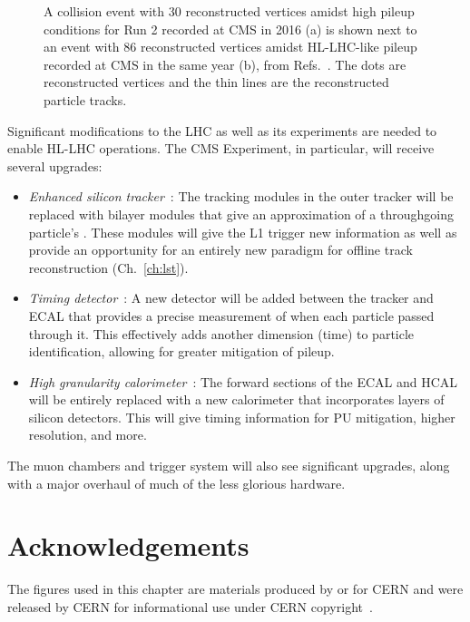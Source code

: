 \begin{figure}[!htb]
    \centering
    \qquad
    \caption[A collision event with high pileup for Run 2 versus another with HL-LHC-like pileup, both recorded in 2016.]{
        A collision event with 30 reconstructed vertices amidst high pileup conditions for Run 2 recorded at CMS in 2016 (a) is shown next to an event with 86 reconstructed vertices amidst HL-LHC-like pileup recorded at CMS in the same year (b), from Refs.~\cite{NormalPU2016, HighPU2016}. 
        The dots are reconstructed vertices and the thin lines are the reconstructed particle tracks.
    }
    \label{fig:pileup}
\end{figure}

Significant modifications to the LHC as well as its experiments are needed to enable HL-LHC operations. 
The CMS Experiment, in particular, will receive several upgrades: 
\begin{itemize}
    \item{
        \textit{Enhanced silicon tracker}~\cite{CERN-LHCC-2017-009}: 
        The tracking modules in the outer tracker will be replaced with bilayer modules that give an approximation of a throughgoing particle's \pt. 
        These modules will give the L1 trigger new information as well as provide an opportunity for an entirely new paradigm for offline track reconstruction (Ch.~\ref{ch:lst}). 
    }
    \item{
        \textit{Timing detector}~\cite{CERN-LHCC-2017-027}: 
        A new detector will be added between the tracker and ECAL that provides a precise measurement of when each particle passed through it. 
        This effectively adds another dimension (time) to particle identification, allowing for greater mitigation of pileup. 
    }
    \item{
            \textit{High granularity calorimeter}~\cite{CERN-LHCC-2017-023, CERN-LHCC-2017-011}: 
        The forward sections of the ECAL and HCAL will be entirely replaced with a new calorimeter that incorporates layers of silicon detectors. 
        This will give timing information for PU mitigation, higher resolution, and more. 
    }
\end{itemize}
The muon chambers and trigger system will also see significant upgrades, along with a major overhaul of much of the less glorious hardware.

\section{Acknowledgements}
The figures used in this chapter are materials produced by or for CERN and were released by CERN for informational use under CERN copyright~\cite{CERNCopyright}. 

